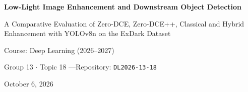 \documentclass[11pt,a4paper]{article}
\newcommand{\TeamLeadName}{Nguyen Minh Hoang}
\newcommand{\TeamLeadID}{2410315}
\newcommand{\MemberTwoName}{Nguyen Minh Luong}
\newcommand{\MemberTwoID}{23BA14184}
\newcommand{\MemberThreeName}{Le Hien Anh}
\newcommand{\MemberThreeID}{2410042}
\newcommand{\MemberFourName}{Luong Quynh Anh}
\newcommand{\MemberFourID}{23BA14008}
\newcommand{\MemberFiveName}{Le Ba Tiep}
\newcommand{\MemberFiveID}{23BA14282}
\newcommand{\MemberSixName}{Le Ba Ninh}
\newcommand{\MemberSixID}{23BA14224}
\begin{document}
\begin{center}
    \centering

    {\LARGE\bfseries
    Low-Light Image Enhancement and Downstream Object Detection \par}

    \vspace{0.35cm}

    {\large
    A Comparative Evaluation of Zero-DCE, Zero-DCE++, Classical and
    Hybrid Enhancement with YOLOv8n on the ExDark Dataset\par}

    \vspace{0.5cm}

    {\large Course: Deep Learning (2026--2027)\par}
    {\large Group 13 $\cdot$ Topic 18 \quad---\quad Repository:
    \texttt{DL2026-13-18}\par}
    \vspace{0.35cm}
    {\large October 6, 2026\par}
\end{center}

\end{document}
